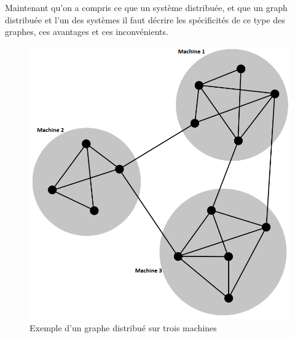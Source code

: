 Maintenant qu’on a compris ce que un système distribuée, et que un graph distribuée et l’un des systèmes il faut décrire les spécificités de ce type des graphes, ces avantages et ces inconvénients.

\begin{figure}[h!]  
  \centering
    \includegraphics[width=1\textwidth]{chapitre2/Figures/Network_Community_Structure.svg.png}
  \caption{Exemple d'un graphe distribué sur trois machines}
\end{figure}

